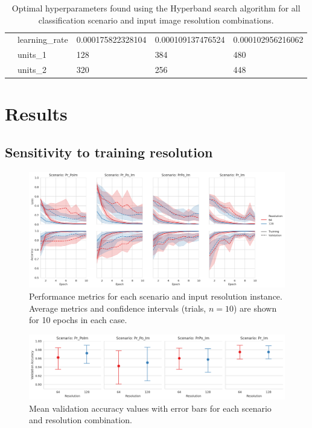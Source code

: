 \documentclass[Journal,letterpaper, SingleSpace, InsideFigs]{ascelike-new}
\begin{document}
\begin{table}[h!]
\begin{tabular}{@{}lllll@{}}
                            & learning\_rate & \num{0.000175822328104} & \num{0.000109137476524} & \num{0.000102956216062} \\
                            & units\_1       & 128               & 384               & 480               \\
                            & units\_2       & 320               & 256               & 448               \\ \bottomrule
\end{tabular}
\caption{Optimal hyperparameters found using the Hyperband search algorithm for all classification scenario and input image resolution combinations.}
    \label{tab:opt-hyp}
\end{table}
\section{Results}


\subsection{Sensitivity to training resolution}

\begin{figure}[ht]
    \centering
    \includegraphics[width=\textwidth]{figures/scenario_resolution_performance.png}
    \caption{Performance metrics for each scenario and input resolution instance. Average metrics and confidence intervals (trials, $n=10$) are shown for 10 epochs in each case.}
    \label{fig:sens-overall}
\end{figure}

\begin{figure}[ht]
    \centering
    \includegraphics[width=\textwidth]{figures/scenario_resolution_validation_accuracy.png}
    \caption{Mean validation accuracy values with error bars for each scenario and resolution combination.}
    \label{fig:sens-val-acc}
\end{figure}
\end{document}
